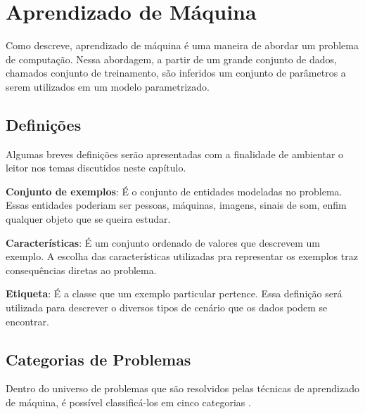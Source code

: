 \chapter{Aprendizado de Máquina}
Como \citet{bishop2006pattern} descreve, aprendizado de máquina é uma maneira de abordar um problema de computação. Nessa abordagem, a partir de um grande conjunto de dados, chamados conjunto de treinamento, são inferidos um conjunto de parâmetros a serem utilizados em um modelo parametrizado.

\section{Definições}

Algumas breves definições serão apresentadas com a finalidade de ambientar o leitor nos temas discutidos neste capítulo.

\begin{description}
\item \textbf{Conjunto de exemplos}: É o conjunto de entidades modeladas no problema. Essas entidades poderiam ser pessoas, máquinas, imagens, sinais de som, enfim qualquer objeto que se queira estudar.

\item \textbf{Características}: É um conjunto ordenado de valores que descrevem um exemplo. A escolha das características utilizadas pra representar os exemplos traz consequências diretas ao problema.

\item \textbf{Etiqueta}: É a classe que um exemplo particular pertence. Essa definição será utilizada para descrever o diversos tipos de cenário que os dados podem se encontrar.
\end{description}


\section{Categorias de Problemas}

Dentro do universo de problemas que são resolvidos pelas técnicas de aprendizado de máquina, é possível classificá-los em cinco categorias \citep{mohri2012foundations}.

